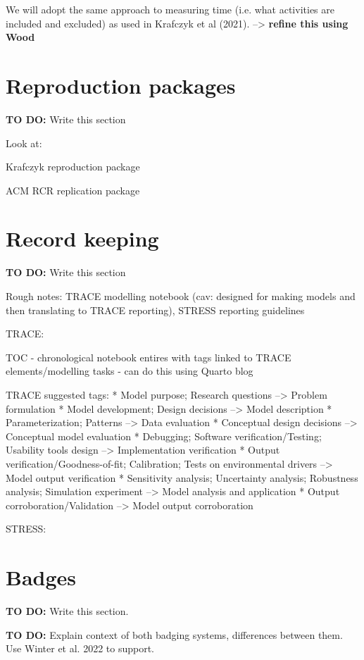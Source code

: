 We will adopt the same approach to measuring time (i.e. what activities are included and excluded) as used in Krafczyk et al (2021). --> \textbf{refine this using Wood}

\section{Reproduction packages}

\textbf{TO DO:} Write this section

Look at:

Krafczyk reproduction package

ACM RCR replication package


\section{Record keeping}

\textbf{TO DO:} Write this section

Rough notes: TRACE modelling notebook (cav: designed for making models and then translating to TRACE reporting), STRESS reporting guidelines

TRACE:

TOC - chronological notebook entires with tags linked to TRACE elements/modelling tasks - can do this using Quarto blog

TRACE suggested tags:
* Model purpose; Research questions --> Problem formulation
* Model development; Design decisions --> Model description
* Parameterization; Patterns --> Data evaluation
* Conceptual design decisions --> Conceptual model evaluation
* Debugging; Software verification/Testing; Usability tools design --> Implementation verification
* Output verification/Goodness-of-fit; Calibration; Tests on environmental drivers --> Model output verification
* Sensitivity analysis; Uncertainty analysis; Robustness analysis; Simulation experiment --> Model analysis and application
* Output corroboration/Validation --> Model output corroboration

STRESS:

\section{Badges}

\textbf{TO DO:} Write this section.

\textbf{TO DO:} Explain context of both badging systems, differences between them. Use Winter et al. 2022 to support.


